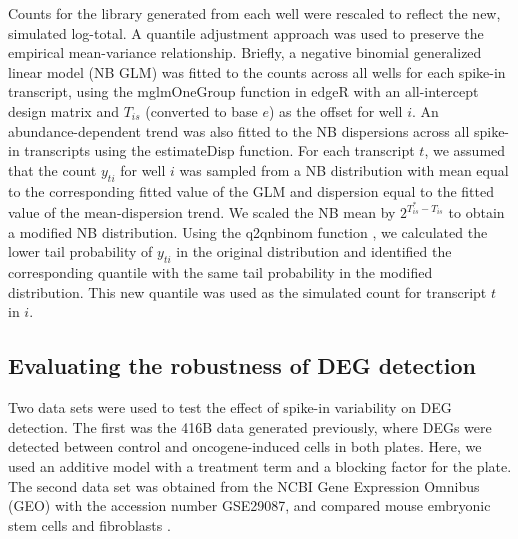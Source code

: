 \documentclass{article}
\begin{document}
Counts for the library generated from each well were rescaled to reflect the new, simulated log-total.
A quantile adjustment approach was used to preserve the empirical mean-variance relationship.
Briefly, a negative binomial generalized linear model (NB GLM) was fitted to the counts across all wells for each spike-in transcript, using the mglmOneGroup function in edgeR \citep{mccarthy2012differential, robinson2010edgeR} with an all-intercept design matrix and $T_{is}$ (converted to base $e$) as the offset for well $i$.
An abundance-dependent trend was also fitted to the NB dispersions across all spike-in transcripts using the estimateDisp function.
For each transcript $t$, we assumed that the count $y_{ti}$ for well $i$ was sampled from a NB distribution with mean equal to the corresponding fitted value of the GLM and dispersion equal to the fitted value of the mean-dispersion trend.
We scaled the NB mean by $2^{T^*_{is} - T_{is}}$ to obtain a modified NB distribution.
Using the q2qnbinom function \citep{robinson2008small}, we calculated the lower tail probability of $y_{ti}$ in the original distribution and identified the corresponding quantile with the same tail probability in the modified distribution.
This new quantile was used as the simulated count for transcript $t$ in $i$.


\subsection*{Evaluating the robustness of DEG detection}
Two data sets were used to test the effect of spike-in variability on DEG detection.
The first was the 416B data generated previously, where DEGs were detected between control and oncogene-induced cells in both plates.
Here, we used an additive model with a treatment term and a blocking factor for the plate.
The second data set was obtained from the NCBI Gene Expression Omnibus (GEO) with the accession number GSE29087, and compared mouse embryonic stem cells and fibroblasts \citep{islam2011characterization}.
\end{document}
